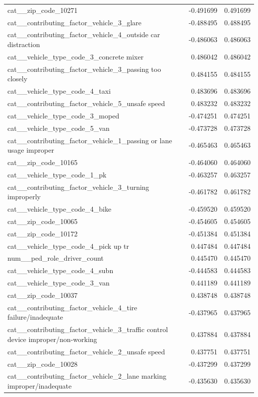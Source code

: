 \begin{tabular}{lrr}
cat__zip_code_10271 & -0.491699 & 0.491699 \\
cat__contributing_factor_vehicle_3_glare & -0.488495 & 0.488495 \\
cat__contributing_factor_vehicle_4_outside car distraction & -0.486063 & 0.486063 \\
cat__vehicle_type_code_3_concrete mixer & 0.486042 & 0.486042 \\
cat__contributing_factor_vehicle_3_passing too closely & 0.484155 & 0.484155 \\
cat__vehicle_type_code_4_taxi & 0.483696 & 0.483696 \\
cat__contributing_factor_vehicle_5_unsafe speed & 0.483232 & 0.483232 \\
cat__vehicle_type_code_3_moped & -0.474251 & 0.474251 \\
cat__vehicle_type_code_5_van & -0.473728 & 0.473728 \\
cat__contributing_factor_vehicle_1_passing or lane usage improper & -0.465463 & 0.465463 \\
cat__zip_code_10165 & -0.464060 & 0.464060 \\
cat__vehicle_type_code_1_pk & -0.463257 & 0.463257 \\
cat__contributing_factor_vehicle_3_turning improperly & -0.461782 & 0.461782 \\
cat__vehicle_type_code_4_bike & -0.459520 & 0.459520 \\
cat__zip_code_10065 & -0.454605 & 0.454605 \\
cat__zip_code_10172 & -0.451384 & 0.451384 \\
cat__vehicle_type_code_4_pick up tr & 0.447484 & 0.447484 \\
num__ped_role_driver_count & 0.445470 & 0.445470 \\
cat__vehicle_type_code_4_subn & -0.444583 & 0.444583 \\
cat__vehicle_type_code_3_van & 0.441189 & 0.441189 \\
cat__zip_code_10037 & 0.438748 & 0.438748 \\
cat__contributing_factor_vehicle_4_tire failure/inadequate & -0.437965 & 0.437965 \\
cat__contributing_factor_vehicle_3_traffic control device improper/non-working & 0.437884 & 0.437884 \\
cat__contributing_factor_vehicle_2_unsafe speed & 0.437751 & 0.437751 \\
cat__zip_code_10028 & -0.437299 & 0.437299 \\
cat__contributing_factor_vehicle_2_lane marking improper/inadequate & -0.435630 & 0.435630 \\

\end{tabular}
